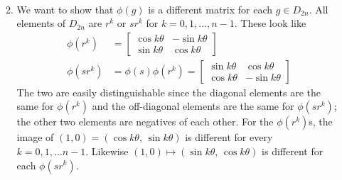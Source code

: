\documentclass[]{article}
\begin{document}
\begin{enumerate}
\begin{enumerate}
\begin{align}
\end{align}
\item We want to show that $\phi(g)$ is a different matrix for each $g \in D_{2n}$. All elements of $D_{2n}$ are $r^k$ or $sr^k$ for $k = 0,1,\ldots,n-1$. These look like
\begin{align}
\phi(r^k) &= \begin{bmatrix}\cos k\theta & -\sin k\theta \\ \sin k\theta & \cos k\theta\end{bmatrix} \\
\phi(sr^k) &= \phi(s)\phi(r^k) = \begin{bmatrix}\sin k\theta & \cos k\theta \\ \cos k\theta & -\sin k\theta\end{bmatrix}
\end{align}
The two are easily distinguishable since the diagonal elements are the same for $\phi(r^k)$ and the off-diagonal elements are the same for $\phi(sr^k)$; the other two elements are negatives of each other. For the $\phi(r^k)$s, the image of $(1,0) = (\cos k\theta,\, \sin k\theta)$ is different for every $k=0,1,\ldots n-1$. Likewise $(1,0) \mapsto (\sin k\theta,\, \cos k\theta)$ is different for each $\phi(sr^k)$.
\end{enumerate}




\end{enumerate}
\end{document}
